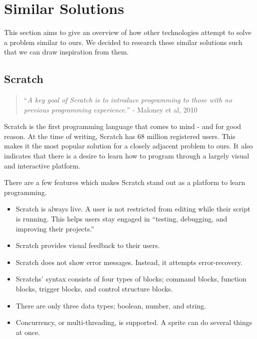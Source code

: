 \section{Similar Solutions}
This section aims to give an overview of how other technologies attempt to solve a problem similar to ours. We decided to research these similar solutions such that we can draw inspiration from them.

\subsection{Scratch}\label{ScratchSection}
\begin{quote}
    ``\emph{A key goal of Scratch is to introduce programming to those with no previous programming experience.}'' - Maloney et al, 2010\cite{maloneyScratchProgrammingLanguage2010}
\end{quote}

Scratch\cite{ScratchImagineProgram} is the first programming language that comes to mind - and for good reason. At the time of writing, Scratch has 68 million registered users\cite{ScratchImagineProgramStatistics}. This makes it the most popular solution for a closely adjacent problem to ours. It also indicates that there is a desire to learn how to program through a largely visual and interactive platform.


There are a few features which makes Scratch stand out as a platform to learn programming.
\begin{itemize}
    \item Scratch is always live. A user is not restricted from editing while their script is running. This helps users stay engaged in ``testing, debugging, and improving their projects.''\cite{maloneyScratchProgrammingLanguage2010}
    \item Scratch provides visual feedback to their users.\cite{maloneyScratchProgrammingLanguage2010}
    \item Scratch does not show error messages. Instead, it attempts error-recovery.\cite{maloneyScratchProgrammingLanguage2010}
    \item Scratchs' syntax consists of four types of blocks; command blocks, function blocks, trigger blocks, and control structure blocks.\cite{maloneyScratchProgrammingLanguage2010}
    \item There are only three data types; boolean, number, and string.\cite{maloneyScratchProgrammingLanguage2010}
    \item Concurrency, or multi-threading, is supported. A sprite can do several things at once.\cite{maloneyScratchProgrammingLanguage2010}
\end{itemize}

